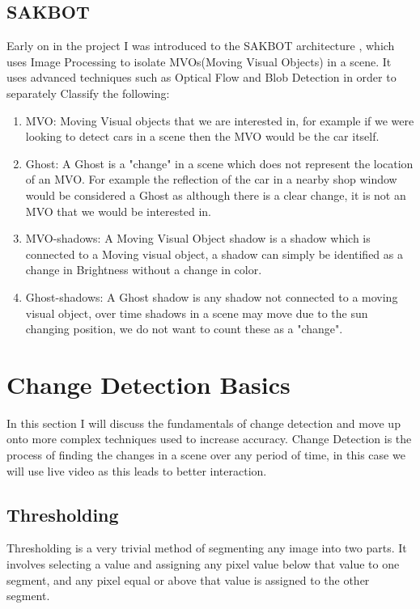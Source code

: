 \documentclass[a4paper]{report}
\begin{document}
\section{SAKBOT}
Early on in the project I was introduced to the SAKBOT architecture \cite{SAKBOT}, which uses Image Processing to isolate MVOs(Moving Visual Objects) in a scene. It uses advanced techniques such as Optical Flow and Blob Detection in order to separately Classify the following:
\begin{enumerate}
  \item MVO: Moving Visual objects that we are interested in, for example if we were looking to detect cars in a scene then the MVO would be the car itself.
  \item Ghost: A Ghost is a "change" in a scene which does not represent the location of an MVO. For example the reflection of the car in a nearby shop window would be considered a Ghost as although there is a clear change, it is not an MVO that we would be interested in.
  \item MVO-shadows: A Moving Visual Object shadow is a shadow which is connected to a Moving visual object, a shadow can simply be identified as a change in Brightness without a change in color.
  \item Ghost-shadows: A Ghost shadow is any shadow not connected to a moving visual object, over time shadows in a scene may move due to the sun changing position, we do not want to count these as a "change".
\end{enumerate}


\chapter{Change Detection Basics}
In this section I will discuss the fundamentals of change detection and move up onto more complex techniques used to increase accuracy. Change Detection is the process of finding the changes in a scene over any period of time, in this case we will use live video as this leads to better interaction.

\section{Thresholding}
Thresholding is a very trivial method of segmenting any image into two parts. It involves selecting a value and assigning any pixel value below that value to one segment, and any pixel equal or above that value is assigned to the other segment.
\end{document}
